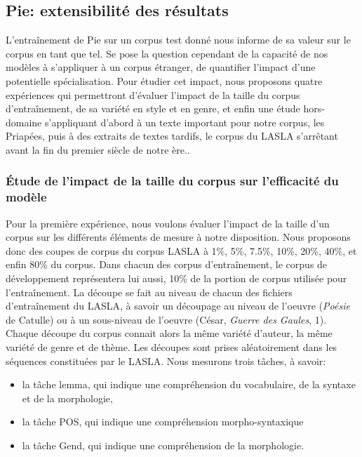 \subsection{Pie: extensibilité des résultats}

L'entraînement de Pie sur un corpus test donné nous informe de sa valeur sur le corpus en tant que tel. Se pose la question cependant de la capacité de nos modèles à s'appliquer à un corpus étranger, de quantifier l'impact d'une potentielle spécialisation. Pour étudier cet impact, nous proposons quatre expériences qui permettront d'évaluer l'impact de la taille du corpus d'entraînement, de sa variété en style et en genre, et enfin une étude hors-domaine s'appliquant d'abord à un texte important pour notre corpus, les Priapées, puis à des extraits de textes tardifs, le corpus du LASLA s'arrêtant avant la fin du premier siècle de notre ère..

\subsubsection{Étude de l'impact de la taille du corpus sur l'efficacité du modèle}
\label{lemmatisation:extensibilite:tailles}

Pour la première expérience, nous voulons évaluer l'impact de la taille d'un corpus sur les différents éléments de mesure à notre disposition. Nous proposons donc des coupes de corpus du corpus LASLA à 1\%, 5\%, 7.5\%, 10\%, 20\%, 40\%, et enfin 80\% du corpus. Dans chacun des corpus d'entraînement, le corpus de développement représentera lui aussi, 10\% de la portion de corpus utilisée pour l'entraînement. La découpe se fait au niveau de chacun des fichiers d'entraînement du LASLA, à savoir un découpage au niveau de l'oeuvre (\textit{Poésie} de Catulle) ou à un sous-niveau de l'oeuvre (César, \textit{Guerre des Gaules}, 1). Chaque découpe du corpus connait alors la même variété d'auteur, la même variété de genre et de thème. Les découpes sont prises aléatoirement dans les séquences constituées par le LASLA. Nous mesurons trois tâches, à savoir:

\begin{itemize}
    \item la tâche lemma, qui indique une compréhension du vocabulaire, de la syntaxe et de la morphologie,
    \item la tâche POS, qui indique une compréhension morpho-syntaxique
    \item la tâche Gend, qui indique une compréhension de la morphologie.
\end{itemize}

